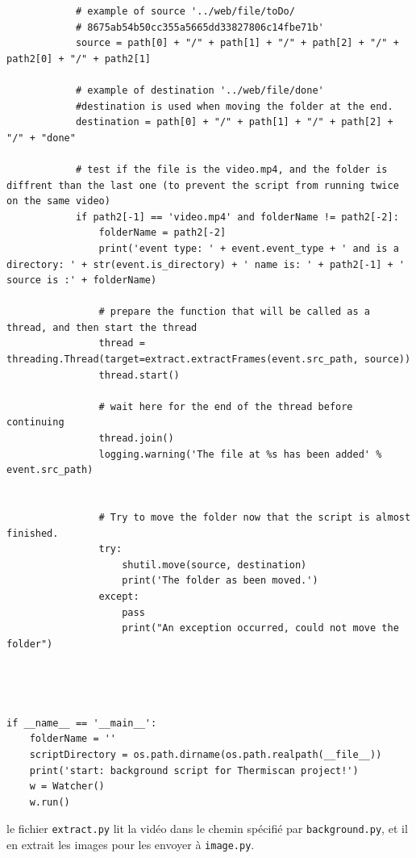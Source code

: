 \documentclass[12pt]{article}
\begin{document}
\begin{lstlisting}
            # example of source '../web/file/toDo/
            # 8675ab54b50cc355a5665dd33827806c14fbe71b'
            source = path[0] + "/" + path[1] + "/" + path[2] + "/" + path2[0] + "/" + path2[1]

            # example of destination '../web/file/done'
            #destination is used when moving the folder at the end.
            destination = path[0] + "/" + path[1] + "/" + path[2] + "/" + "done"
            
            # test if the file is the video.mp4, and the folder is diffrent than the last one (to prevent the script from running twice on the same video)
            if path2[-1] == 'video.mp4' and folderName != path2[-2]:
                folderName = path2[-2]
                print('event type: ' + event.event_type + ' and is a directory: ' + str(event.is_directory) + ' name is: ' + path2[-1] + ' source is :' + folderName)

                # prepare the function that will be called as a thread, and then start the thread
                thread = threading.Thread(target=extract.extractFrames(event.src_path, source))
                thread.start()

                # wait here for the end of the thread before continuing
                thread.join()
                logging.warning('The file at %s has been added' % event.src_path)


                # Try to move the folder now that the script is almost finished.
                try:
                    shutil.move(source, destination)
                    print('The folder as been moved.')
                except:
                    pass
                    print("An exception occurred, could not move the folder")
            
            


if __name__ == '__main__':
    folderName = ''
    scriptDirectory = os.path.dirname(os.path.realpath(__file__))
    print('start: background script for Thermiscan project!')
    w = Watcher()
    w.run()
\end{lstlisting}

le fichier \texttt{extract.py} lit la vidéo dans le chemin spécifié par \texttt{background.py}, et il en extrait les images pour les envoyer à \texttt{image.py}.
\end{document}
